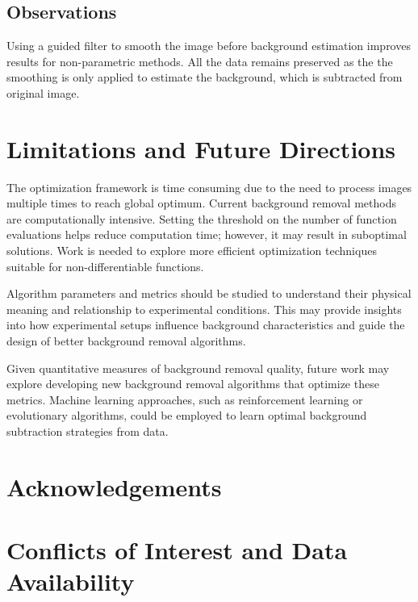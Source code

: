 \documentclass[iucr,review]{iucrjournals}
\begin{document}
\subsection{Observations}
Using a guided filter to smooth the image before background estimation improves results for non-parametric methods.
All the data remains preserved as the the smoothing
is only applied to estimate the background, which is subtracted from original image.

\section{Limitations and Future Directions}

The optimization framework is time consuming due to the need to process images multiple
times to reach global optimum. Current background removal methods are computationally intensive.
Setting the threshold on the number of function evaluations helps reduce computation time;
however, it may result in suboptimal solutions. Work is needed to explore more efficient
optimization techniques
suitable for non-differentiable functions.

Algorithm parameters and metrics should be studied
to understand their physical meaning and relationship to experimental conditions.
This may provide insights into how experimental setups influence background characteristics
and guide the design of better background removal algorithms.

Given quantitative measures of background removal quality, future work may explore
developing new background removal algorithms that optimize these metrics.
Machine learning approaches, such as reinforcement learning or evolutionary algorithms,
could be employed to learn optimal background subtraction strategies from data.








\section*{Acknowledgements}


\section*{Conflicts of Interest and Data Availability} 





\appendix

\end{document}
